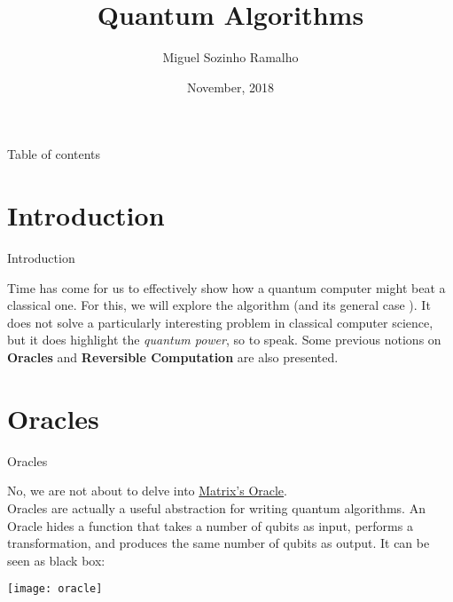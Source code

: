 \documentclass[aspectratio=43]{beamer}
\title{Quantum Algorithms}
\date{November, 2018}
\author[Ramalho]{Miguel Sozinho Ramalho}
\begin{document}
\begin{frame}
	\titlepage
\end{frame}


\begin{frame}{Table of contents}
	\begin{card}
		\tableofcontents
	\end{card}
\end{frame}


\section{Introduction}
\begin{frame}{Introduction}
    \begin{card}
        Time has come for us to effectively show how a quantum computer might beat a classical one. For this, we will explore the \ds algorithm (and its general case \djs). It does not solve a particularly interesting problem in classical computer science, but it does highlight the \textit{quantum power}, so to speak. Some previous notions on \textbf{\q Oracles} and \textbf{Reversible Computation} are also presented.
    \end{card}
\pagenumber
\end{frame}

\section{\q Oracles}
\begin{frame}{\q Oracles}
\begin{card}
    No, we are not about to delve into  \href{https://en.wikipedia.org/wiki/The_Oracle_(The_Matrix)}{Matrix's Oracle}.\\
    \q Oracles are actually a useful abstraction for writing quantum algorithms. An Oracle hides a function that takes a number of qubits as input, performs a transformation, and produces the same number of qubits as output. It can be seen as black box:
    \begin{center}
        \texttt{[image: oracle]}
    \end{center}
\end{card}
\pagenumber
\end{frame}
\end{document}
